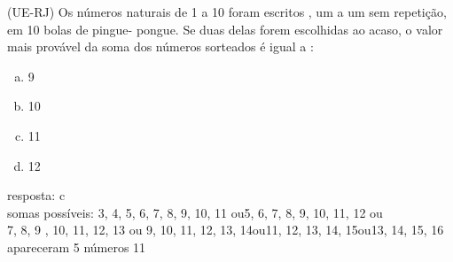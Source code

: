 \begin{ex}
 (UE-RJ) Os números naturais de 1  a 10 foram escritos , um a um sem repetição, em 10 bolas de pingue- pongue. Se duas delas forem escolhidas ao acaso, o valor mais provável da soma dos números sorteados é igual a :
    \begin{enumerate}[(a)]
    \item 9
    \item 10
    \item 11
    \item 12
    \end{enumerate}
      \begin{sol}
        resposta: c \\
        somas possíveis: 3, 4, 5, 6, 7, 8, 9, 10, 11\hspace{0,2cm} ou\hspace{0,2cm}5, 6, 7, 8, 9, 10, 11, 12\hspace{0,2cm} ou \\
        7, 8, 9 , 10, 11, 12, 13 \hspace{0,2cm}ou\hspace{0,2cm} 9, 10, 11, 12, 13, 14\hspace{0,2cm}ou\hspace{0,2cm}11, 12, 13, 14, 15\hspace{0,2cm}ou\hspace{0,2cm}13, 14, 15, 16
        apareceram 5 números 11
      \end{sol}
\end{ex}
